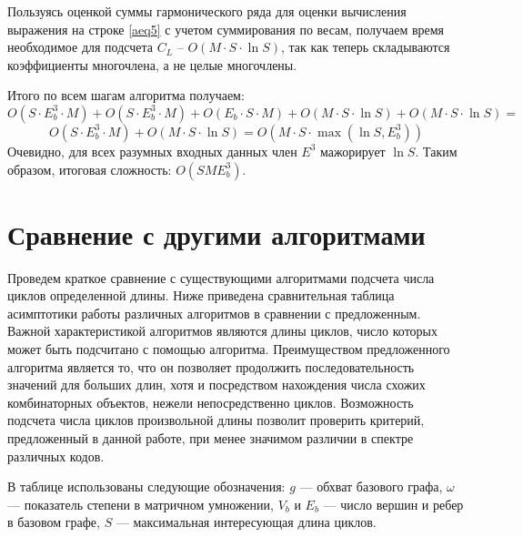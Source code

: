 Пользуясь оценкой суммы гармонического ряда для оценки вычисления выражения на строке \ref{aeq5} с учетом суммирования по весам, получаем
время необходимое для подсчета $C_L$ -- $O(M \cdot S \cdot \ln S)$, так как теперь складываются 
коэффициенты многочлена, а не целые многочлены.

Итого по всем шагам алгоритма получаем:
\[
O(S \cdot E_b^3 \cdot M) + O(S \cdot E_b^3 \cdot M) + 
O(E_b \cdot S \cdot M) + O(M \cdot S \cdot \ln S) + O(M \cdot S \cdot \ln S)= 
\]
\[
O(S \cdot E_b^3 \cdot M) + O(M \cdot S \cdot \ln S) = O(M \cdot S \cdot \max(\ln S, E_b^3))
\]
Очевидно, для всех разумных входных данных член $E^3$ мажорирует $\ln S$. Таким образом, итоговая сложность: $O(SME_b^3)$.


\section{Сравнение с другими алгоритмами}

Проведем краткое сравнение с существующими алгоритмами подсчета числа циклов определенной длины. Ниже приведена
сравнительная таблица асимптотики работы различных алгоритмов в сравнении с предложенным. Важной характеристикой алгоритмов являются длины циклов, число которых может быть подсчитано с помощью алгоритма. 
Преимуществом предложенного алгоритма является то, что он позволяет продолжить последовательность 
значений для больших длин, хотя и посредством нахождения числа схожих комбинаторных объектов, нежели непосредственно циклов. Возможность подсчета числа циклов произвольной длины позволит проверить критерий, предложенный в данной работе, при менее значимом различии в спектре различных кодов.

В таблице использованы следующие обозначения: $g$ --- обхват базового графа, $\omega$ --- показатель степени в матричном умножении, $V_b$ и $E_b$ --- число вершин и ребер в базовом графе, $S$ --- максимальная интересующая длина циклов. 

